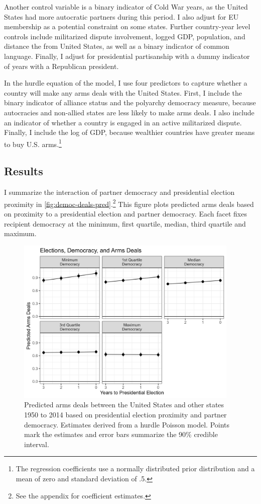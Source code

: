 \documentclass[12pt]{article}
\begin{document}
Another control variable is a binary indicator of Cold War years, as the United States had more autocratic partners during this period. 
I also adjust for EU membership as a potential constraint on some states. 
Further country-year level controls include militarized dispute involvement, logged GDP, population, and distance the from United States, as well as a binary indicator of common language. 
Finally, I adjust for presidential partisanship with a dummy indicator of years with a Republican president.  


In the hurdle equation of the model, I use four predictors to capture whether a country will make any arms deals with the United States. 
First, I include the binary indicator of alliance status and the polyarchy democracy measure, because autocracies and non-allied states are less likely to make arms deals. 
I also include an indicator of whether a country is engaged in an active militarized dispute. 
Finally, I include the log of GDP, because wealthier countries have greater means to buy U.S. arms.\footnote{The regression coefficients use a normally distributed prior distribution and a mean of zero and standard deviation of .5.}


\subsection{Results}


I summarize the interaction of partner democracy and presidential election proximity in \autoref{fig:democ-deals-pred}.\footnote{See the appendix for coefficient estimates.}
This figure plots predicted arms deals based on proximity to a presidential election and partner democracy.
Each facet fixes recipient democracy at the minimum, first quartile, median, third quartile and maximum.


\begin{figure}[htpb]
	\centering
		\includegraphics[width=0.95\textwidth]{../figures/democ-deals-pred.png}
	\caption{Predicted arms deals between the United States and other states 1950 to 2014 based on presidential election proximity and partner democracy. Estimates derived from a hurdle Poisson model. Points mark the estimates and error bars summarize the 90\% credible interval.}
	\label{fig:democ-deals-pred}
\end{figure}
\end{document}
